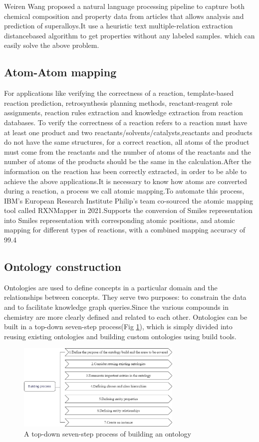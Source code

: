 \documentclass[%
 aip,
 jmp,%
 amsmath,amssymb,
 reprint,%
]{revtex4-2}
\begin{document}
Weiren Wang proposed a natural language processing pipeline to capture both chemical composition and property data from articles that allows analysis
and prediction of superalloys.It use a heuristic text multiple-relation extraction distancebased algorithm to get properties without any labeled samples.
which can easily solve the above problem.

\subsection{Atom-Atom mapping}
For applications like verifying the correctness of a reaction, template-based reaction prediction, 
retrosynthesis planning methods, reactant-reagent role assignments, reaction rules extraction and knowledge
extraction from reaction databases. To verify the correctness of a reaction refers to a reaction must have 
at least one product and two reactants/solvents/catalysts,reactants and products do not have the same structures,
for a correct reaction, all atoms of the product must come from the reactants and the number of atoms of the
reactants and the number of atoms of the products should be the same in the calculation.After the information on 
the reaction has been correctly extracted, in order to be able to achieve the above applications.It is necessary
to know how atoms are converted during a reaction, a process we call atomic mapping.To automate this process, 
IBM's European Research Institute Philip's team co-sourced the atomic mapping tool called RXNMapper 
in 2021.Supports the conversion of Smiles representation into Smiles representation with 
corresponding atomic positions, and atomic mapping for different types of reactions, 
with a combined mapping accuracy of 99.4%

\subsection{Ontology construction}
Ontologies are used to define concepts in a particular domain and the relationships between concepts. They serve two purposes: to constrain 
the data and to facilitate knowledge graph queries.Since the various compounds in chemistry are more clearly defined and related to each other.
Ontologies can be built in a top-down seven-step process(Fig \ref{ Fig.4 }), which is simply divided 
into reusing existing ontologies and building custom ontologies using build tools.
\begin{figure}[htbp]
 \centering
 \includegraphics[width=0.7\textwidth]{figure/4.png}
 \caption{ A top-down seven-step process of building an ontology }
 \label{ Fig.4 }
\end{figure}
\end{document}
